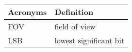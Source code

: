 \begin{center}
\begin{longtable}{ll}
  \hline
  \textbf{Acronyms} & \textbf{Definition} \\
  \hline\hline

FOV	&	field of view	\\
LSB     &       lowest significant bit  \\

  \hline
\end{longtable}
\end{center}

